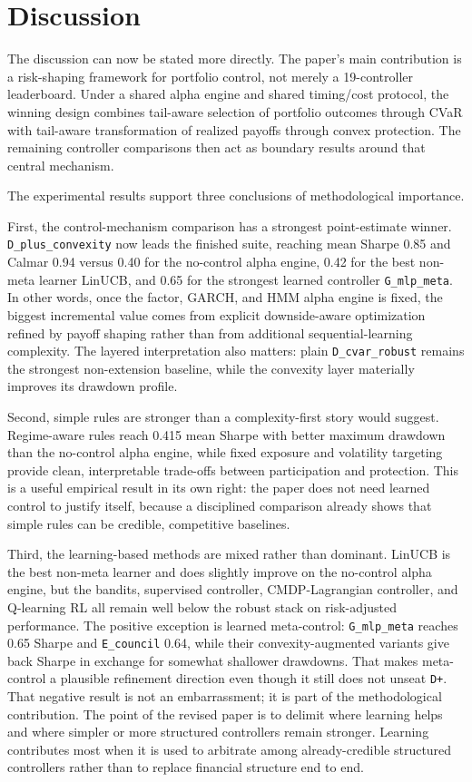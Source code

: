 \documentclass[11pt]{article}
\begin{document}
\section{Discussion}

The discussion can now be stated more directly. The paper's main contribution is a risk-shaping framework for portfolio control, not merely a 19-controller leaderboard. Under a shared alpha engine and shared timing/cost protocol, the winning design combines tail-aware selection of portfolio outcomes through CVaR with tail-aware transformation of realized payoffs through convex protection. The remaining controller comparisons then act as boundary results around that central mechanism.

The experimental results support three conclusions of methodological importance.

First, the control-mechanism comparison has a strongest point-estimate winner.
\texttt{D\_plus\_convexity} now leads the finished suite, reaching mean Sharpe
0.85 and Calmar 0.94 versus 0.40 for the no-control alpha engine, 0.42 for the
best non-meta learner LinUCB, and 0.65 for the strongest learned controller
\texttt{G\_mlp\_meta}. In other words, once the factor, GARCH,
and HMM alpha engine is fixed, the biggest incremental value comes from
explicit downside-aware optimization refined by payoff shaping rather than from
additional sequential-learning complexity. The layered interpretation also
matters: plain \texttt{D\_cvar\_robust} remains the strongest non-extension
baseline, while the convexity layer materially improves its drawdown profile.

Second, simple rules are stronger than a complexity-first story would suggest.
Regime-aware rules reach 0.415 mean Sharpe with better maximum drawdown than
the no-control alpha engine, while fixed exposure and volatility targeting provide
clean, interpretable trade-offs between participation and protection. This is a
useful empirical result in its own right: the paper does not need learned
control to justify itself, because a disciplined comparison already shows that
simple rules can be credible, competitive baselines.

Third, the learning-based methods are mixed rather than dominant. LinUCB is the
best non-meta learner and does slightly improve on the no-control alpha engine,
but the bandits, supervised controller, CMDP-Lagrangian controller, and
Q-learning RL all remain well below the robust stack on risk-adjusted
performance. The positive exception is learned meta-control:
\texttt{G\_mlp\_meta} reaches 0.65 Sharpe and \texttt{E\_council} 0.64, while
their convexity-augmented variants give back Sharpe in exchange for somewhat
shallower drawdowns. That makes meta-control a plausible refinement direction
even though it still does not unseat \texttt{D+}. That negative result is not an
embarrassment; it is part of the methodological contribution. The point of the revised paper is to delimit where learning helps and where simpler or more structured controllers remain stronger. Learning contributes most when it is used to arbitrate among already-credible structured controllers rather than to replace financial structure end to end.
\end{document}
